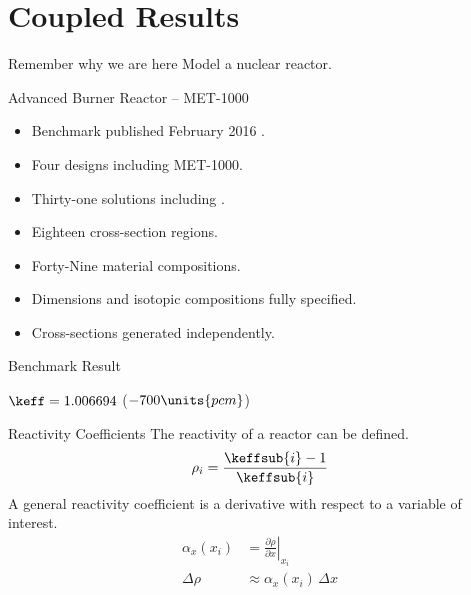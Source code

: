 \section{Coupled Results}
\label{sec:coupledResults}

\begin{frame}{Remember why we are here}
  \pause
  \huge Model a nuclear reactor.
\end{frame}

\begin{frame}{Advanced Burner Reactor -- MET-1000}
  \begin{itemize}
    \item Benchmark published February 2016 \cite{abr}.
    \item Four designs including MET-1000.
    \item Thirty-one solutions including \dif.
  \end{itemize}
  \vspace{0.2in}
  \begin{itemize}
    \item Eighteen cross-section regions.
    \item Forty-Nine material compositions.
    \item Dimensions and isotopic compositions fully specified.
    \item Cross-sections generated independently.
  \end{itemize}
\end{frame}

\begin{frame}{Benchmark Result}
  \vspace{-0.25in}
  \begin{figure}
    \centering
    \hspace{1in}
  \end{figure}
  \begin{block}{}
    \centering
    $\keff =  1.006694 $ \qquad (\dif $-700\units{pcm}$)
  \end{block}
\end{frame}

\begin{frame}{Reactivity Coefficients}
  The reactivity of a reactor can be defined.
  \begin{equation}
    \label{eq:reactivity}
    \rho_i = \frac{\keffsub{i} - 1}{\keffsub{i}}
  \end{equation}
  A general reactivity coefficient is a derivative with respect to a variable of
  interest.
  \begin{align}
    \label{eq:reactivity_coefficient}
    \alpha_x(x_i) &= \left. \frac{\partial \rho}{\partial x} \right|_{x_i} \\
    \Delta \rho &\approx \alpha_x(x_i) \, \Delta x
  \end{align}
\end{frame}

